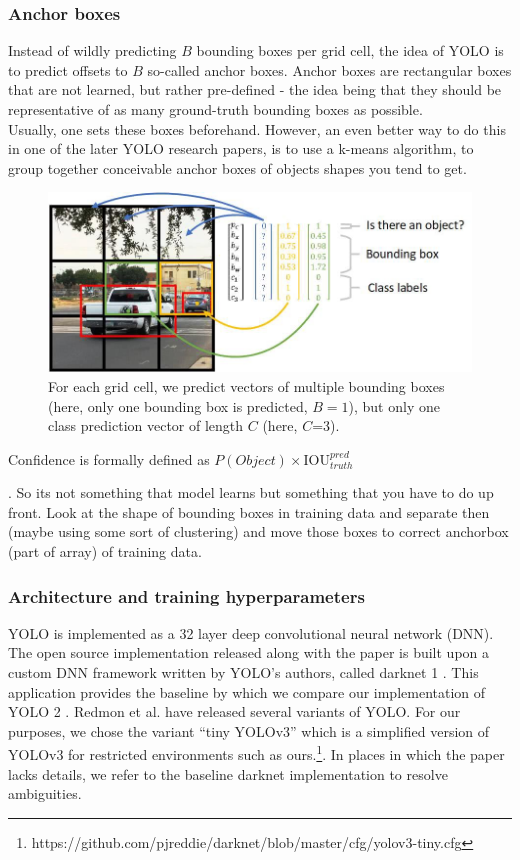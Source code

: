 \documentclass[a4paper]{article}
\begin{document}
\subsubsection*{Anchor boxes}
Instead of wildly predicting $B$ bounding boxes per grid cell, the idea of YOLO is to predict offsets to $B$ so-called anchor boxes. Anchor boxes are rectangular boxes that are not learned, but rather pre-defined - the idea being that they should be representative of as many ground-truth bounding boxes as possible. \\
Usually, one sets these boxes beforehand. However, an even better way to do this in one of the later YOLO research papers, is to use a k-means algorithm, to group together conceivable anchor boxes of objects shapes you tend to get. 
\begin{figure}
\includegraphics[scale=0.35]{images/yolo_mechanics}
\caption{For each grid cell, we predict vectors of multiple bounding boxes (here, only one bounding box is predicted, $B=1$), but only one class prediction vector of length $C$ (here, $C$=3).}

\end{figure}
Confidence is formally defined as $P(Object) \times \text{IOU}^{pred}_{truth}$

. So its not something that model learns but something that you have to do up front. Look at the shape of bounding boxes in training data and separate then (maybe using some sort of clustering) and move those boxes to correct anchorbox (part of array) of training data.

\subsubsection*{Architecture and training hyperparameters}
YOLO is implemented as a 32 layer deep convolutional
neural network (DNN). The open source implementation released
along with the paper is built upon a custom DNN
framework written by YOLO’s authors, called darknet 1
.
This application provides the baseline by which we compare
our implementation of YOLO 2
. Redmon et al. have
released several variants of YOLO. For our purposes, we
chose the variant ``tiny YOLOv3'' which is a simplified version of YOLOv3 for restricted environments such as ours.\footnote{https://github.com/pjreddie/darknet/blob/master/cfg/yolov3-tiny.cfg}. In places in which the paper lacks details, we refer to the baseline darknet implementation
to resolve ambiguities.
\end{document}
